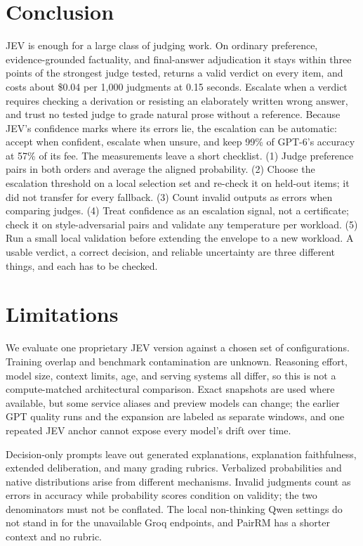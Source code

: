 \documentclass[11pt]{article}
\begin{document}
\section{Conclusion}
JEV is enough for a large class of judging work. On ordinary preference, evidence-grounded factuality, and final-answer adjudication it stays within three points of the strongest judge tested, returns a valid verdict on every item, and costs about \$0.04 per 1,000 judgments at 0.15 seconds. Escalate when a verdict requires checking a derivation or resisting an elaborately written wrong answer, and trust no tested judge to grade natural prose without a reference. Because JEV's confidence marks where its errors lie, the escalation can be automatic: accept when confident, escalate when unsure, and keep 99\% of GPT-6's accuracy at 57\% of its fee. The measurements leave a short checklist. (1) Judge preference pairs in both orders and average the aligned probability. (2) Choose the escalation threshold on a local selection set and re-check it on held-out items; it did not transfer for every fallback. (3) Count invalid outputs as errors when comparing judges. (4) Treat confidence as an escalation signal, not a certificate; check it on style-adversarial pairs and validate any temperature per workload. (5) Run a small local validation before extending the envelope to a new workload. A usable verdict, a correct decision, and reliable uncertainty are three different things, and each has to be checked.
\label{page:mainend}

\raggedbottom
\section*{Limitations}
\label{sec:limitations}
We evaluate one proprietary JEV version against a chosen set of configurations. Training overlap and benchmark contamination are unknown. Reasoning effort, model size, context limits, age, and serving systems all differ, so this is not a compute-matched architectural comparison. Exact snapshots are used where available, but some service aliases and preview models can change; the earlier GPT quality runs and the expansion are labeled as separate windows, and one repeated JEV anchor cannot expose every model's drift over time.

Decision-only prompts leave out generated explanations, explanation faithfulness, extended deliberation, and many grading rubrics. Verbalized probabilities and native distributions arise from different mechanisms. Invalid judgments count as errors in accuracy while probability scores condition on validity; the two denominators must not be conflated. The local non-thinking Qwen settings do not stand in for the unavailable Groq endpoints, and PairRM has a shorter context and no rubric.
\end{document}
